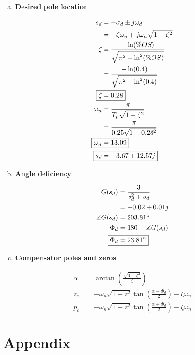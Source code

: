 \documentclass[12pt,a4paper]{article}
\begin{document}
\begin{enumerate}[(a)]

\item \textbf{Desired pole location}

\begin{align}
	s_d &= -\sigma_d \pm j\omega_d \\
	&= -\zeta\omega_n + j\omega_n \sqrt{1-\zeta^2} \\
	\zeta &= \frac{-\ln(\%OS)}{\sqrt{\pi^2 + \ln^2(\%OS)}} \\
	&= \frac{-\ln(0.4)}{\sqrt{\pi^2 + \ln^2(0.4)}} \\
	\Aboxed{
		\zeta &= 0.28
	} \label{eq:zeta} \\
	\omega_n &= \frac{\pi}{T_p \sqrt{1-\zeta^2}} \\
	&= \frac{\pi}{0.25\sqrt{1-0.28^2}} \\
	\Aboxed{
		\omega_n &= 13.09
	} \label{eq:natural-freq} \\
	\Aboxed{
		s_d &= -3.67 + 12.57j
	} \label{eq:desired-pole}
\end{align}

\item \textbf{Angle deficiency}

\begin{align}
	G(s_d) &= \frac{3}{s_d^2 + s_d} \\
	&= -0.02 + 0.01j \\
	\measuredangle G(s_d) &= 203.81^\circ \\
	\Phi_d &= 180 - \measuredangle G(s_d) \\
	\Aboxed{
		\Phi_d &= 23.81^\circ
	} \label{eq:angle-def}
\end{align}

\item \textbf{Compensator poles and zeros}

\begin{align}
	\alpha &= \arctan(\frac{\sqrt{1-\zeta^2}}{\zeta}) \\
	z_c &= -\omega_n \sqrt{1-z^2} \tan(\frac{\alpha - \Phi_d}{2}) - \zeta\omega_n \\
	p_c &= -\omega_n \sqrt{1-z^2} \tan(\frac{\alpha + \Phi_d}{2}) - \zeta\omega_n
\end{align}

\end{enumerate}

\clearpage

\section*{Appendix}
\end{document}
